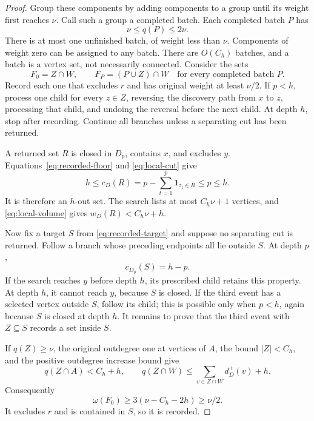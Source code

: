 \documentclass[11pt]{article}
\theoremstyle{definition}
\theoremstyle{remark}
\newcommand{\one}{\mathbf 1}
\newcommand{\wt}{\omega}
\begin{document}
\begin{proof}
Group these components by adding components to a group until its weight first reaches \(\nu\). Call such a group a completed batch. Each completed batch \(P\) has
\begin{equation}
 \nu\le q(P)\le2\nu.
 \label{eq:batch-weight}
\end{equation}
There is at most one unfinished batch, of weight less than \(\nu\). Components of weight zero can be assigned to any batch. There are \(O(C_h)\) batches, and a batch is a vertex set, not necessarily connected. Consider the sets
\begin{equation}
 F_0=Z\cap W,\qquad F_P=(P\cup Z)\cap W
 \quad\text{for every completed batch }P.
 \label{eq:records}
\end{equation}
Record each one that excludes \(r\) and has original weight at least \(\nu/2\). If \(p<h\), process one child for every \(z\in Z\), reversing the discovery path from \(x\) to \(z\), processing that child, and undoing the reversal before the next child. At depth \(h\), stop after recording. Continue all branches unless a separating cut has been returned.

A returned set \(R\) is closed in \(D_p\), contains \(x\), and excludes \(y\). Equations~\eqref{eq:recorded-floor} and \eqref{eq:local-cut} give
\[
 h\le c_D(R)=p-\sum_{t=1}^p\one_{z_t\in R}\le p\le h.
\]
It is therefore an \(h\)-out set. The search lists at most \(C_h\nu+1\) vertices, and \eqref{eq:local-volume} gives \(w_D(R)<C_h\nu+h\).

Now fix a target \(S\) from \eqref{eq:recorded-target} and suppose no separating cut is returned. Follow a branch whose preceding endpoints all lie outside \(S\). At depth \(p\),
\begin{equation}
 c_{D_p}(S)=h-p.
 \label{eq:remaining-boundary}
\end{equation}
If the search reaches \(y\) before depth \(h\), its prescribed child retains this property. At depth \(h\), it cannot reach \(y\), because \(S\) is closed. If the third event has a selected vertex outside \(S\), follow its child; this is possible only when \(p<h\), again because \(S\) is closed at depth \(h\). It remains to prove that the third event with \(Z\subseteq S\) records a set inside \(S\).

If \(q(Z)\ge\nu\), the original outdegree one at vertices of \(A\), the bound \(|Z|<C_h\), and the positive outdegree increase bound give
\[
 q(Z\cap A)<C_h+h,\qquad
 q(Z\cap W)\le\sum_{v\in Z\cap W}d_D^+(v)+h.
\]
Consequently
\[
 \wt(F_0)\ge3(\nu-C_h-2h)\ge\nu/2.
\]
It excludes \(r\) and is contained in \(S\), so it is recorded.


\end{proof}
\end{document}
